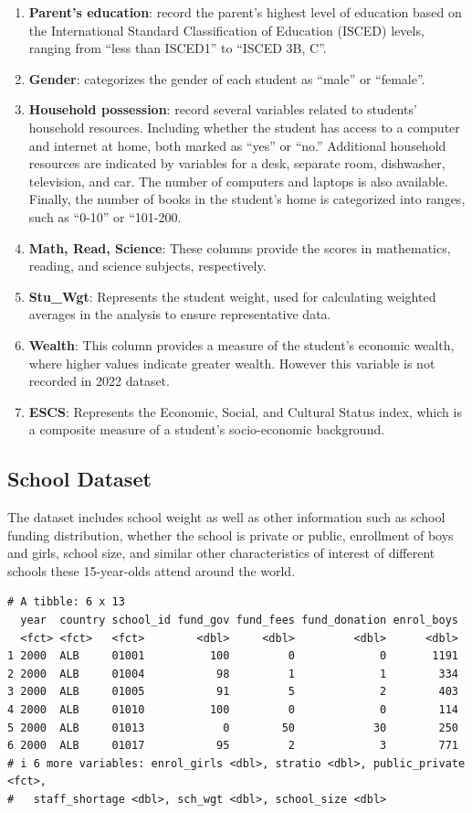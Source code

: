 \documentclass[
  11pt,
  a4paper,
]{article}
\begin{document}
\begin{enumerate}
\def\labelenumi{\arabic{enumi}.}
\item
  \textbf{Parent's education}: record the parent's highest level of
  education based on the International Standard Classification of
  Education (ISCED) levels, ranging from ``less than ISCED1'' to ``ISCED
  3B, C''.
\item
  \textbf{Gender}: categorizes the gender of each student as ``male'' or
  ``female''.
\item
  \textbf{Household possession}: record several variables related to
  students' household resources. Including whether the student has
  access to a computer and internet at home, both marked as ``yes'' or
  ``no.'' Additional household resources are indicated by variables for
  a desk, separate room, dishwasher, television, and car. The number of
  computers and laptops is also available. Finally, the number of books
  in the student's home is categorized into ranges, such as ``0-10'' or
  ``101-200.
\item
  \textbf{Math, Read, Science}: These columns provide the scores in
  mathematics, reading, and science subjects, respectively.
\item
  \textbf{Stu\_Wgt}: Represents the student weight, used for calculating
  weighted averages in the analysis to ensure representative data.
\item
  \textbf{Wealth}: This column provides a measure of the student's
  economic wealth, where higher values indicate greater wealth. However
  this variable is not recorded in 2022 dataset.
\item
  \textbf{ESCS}: Represents the Economic, Social, and Cultural Status
  index, which is a composite measure of a student's socio-economic
  background.
\end{enumerate}

\subsection{School Dataset}\label{school-dataset}

The dataset includes school weight as well as other information such as
school funding distribution, whether the school is private or public,
enrollment of boys and girls, school size, and similar other
characteristics of interest of different schools these 15-year-olds
attend around the world.

\begin{verbatim}
# A tibble: 6 x 13
  year  country school_id fund_gov fund_fees fund_donation enrol_boys
  <fct> <fct>   <fct>        <dbl>     <dbl>         <dbl>      <dbl>
1 2000  ALB     01001          100         0             0       1191
2 2000  ALB     01004           98         1             1        334
3 2000  ALB     01005           91         5             2        403
4 2000  ALB     01010          100         0             0        114
5 2000  ALB     01013            0        50            30        250
6 2000  ALB     01017           95         2             3        771
# i 6 more variables: enrol_girls <dbl>, stratio <dbl>, public_private <fct>,
#   staff_shortage <dbl>, sch_wgt <dbl>, school_size <dbl>
\end{verbatim}
\end{document}
